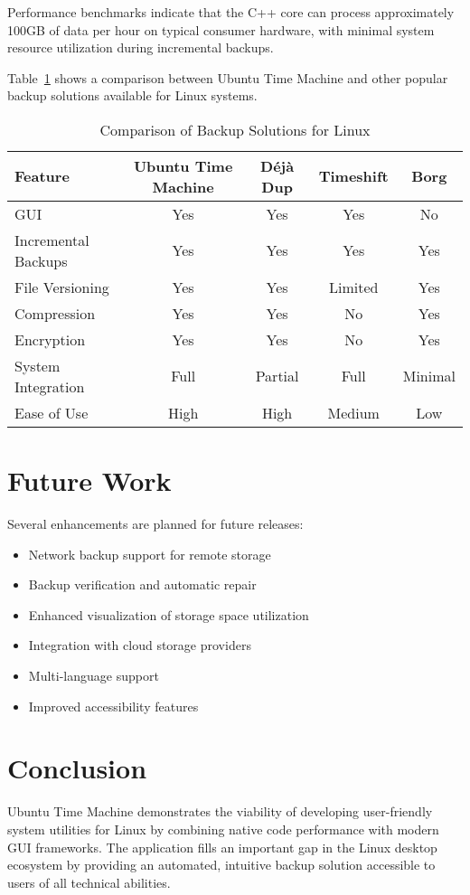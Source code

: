 \documentclass[journal,twoside,10pt]{IEEEtran}
\begin{document}
Performance benchmarks indicate that the C++ core can process approximately 100GB of data per hour on typical consumer hardware, with minimal system resource utilization during incremental backups.

Table~\ref{tab:comparison} shows a comparison between Ubuntu Time Machine and other popular backup solutions available for Linux systems.

\begin{table}[!t]
\caption{Comparison of Backup Solutions for Linux}
\label{tab:comparison}
\centering
\begin{tabular}{|p{2cm}|c|c|c|c|}
\hline
\textbf{Feature} & \textbf{Ubuntu Time Machine} & \textbf{Déjà Dup} & \textbf{Timeshift} & \textbf{Borg} \\
\hline
GUI & Yes & Yes & Yes & No \\
\hline
Incremental Backups & Yes & Yes & Yes & Yes \\
\hline
File Versioning & Yes & Yes & Limited & Yes \\
\hline
Compression & Yes & Yes & No & Yes \\
\hline
Encryption & Yes & Yes & No & Yes \\
\hline
System Integration & Full & Partial & Full & Minimal \\
\hline
Ease of Use & High & High & Medium & Low \\
\hline
\end{tabular}
\end{table}

\section{Future Work}
Several enhancements are planned for future releases:
\begin{itemize}
    \item Network backup support for remote storage
    \item Backup verification and automatic repair
    \item Enhanced visualization of storage space utilization
    \item Integration with cloud storage providers
    \item Multi-language support
    \item Improved accessibility features
\end{itemize}

\section{Conclusion}
Ubuntu Time Machine demonstrates the viability of developing user-friendly system utilities for Linux by combining native code performance with modern GUI frameworks. The application fills an important gap in the Linux desktop ecosystem by providing an automated, intuitive backup solution accessible to users of all technical abilities.
\end{document}
